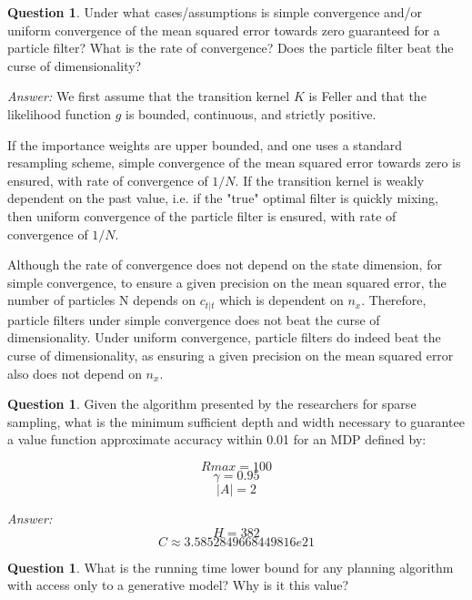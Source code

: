 \documentclass{article}
\theoremstyle{definition}
\newtheorem{question}[thm]{Question}
\newenvironment{answer}{\noindent\textit{Answer:}}{}
\begin{document}
\begin{question}
    Under what cases/assumptions is simple convergence and/or uniform convergence of the mean squared error towards zero guaranteed for a particle filter?  What is the rate of convergence? Does the particle filter beat the curse of dimensionality?
\end{question}

\begin{answer}
    We first assume that the transition kernel $K$ is Feller and that the likelihood function $g$ is bounded, continuous, and strictly positive.

If the importance weights are upper bounded, and one uses a standard resampling scheme, simple convergence of the mean squared error towards zero is ensured, with rate of convergence of $1/N$. If the transition kernel is weakly dependent on the past value, i.e. if the "true" optimal filter is quickly mixing, then uniform convergence of the particle filter is ensured, with rate of convergence of $1/N$.

Although the rate of convergence does not depend on the state dimension, for simple convergence, to ensure a given precision on the mean squared error, the number of particles N depends on $c_{t|t}$ which is dependent on $n_x$. Therefore, particle filters under simple convergence does not beat the curse of dimensionality. Under uniform convergence, particle filters do indeed beat the curse of dimensionality, as ensuring a given precision on the mean squared error also does not depend on $n_x$.
\end{answer}

\begin{question}
    Given the algorithm presented by the researchers for sparse sampling, what
is the minimum sufficient depth and width necessary to guarantee a value
function approximate accuracy within 0.01 for an MDP defined by:

$$Rmax = 100$$
$$\gamma = 0.95$$
$$|A| = 2$$
\end{question}

\begin{answer}
$$H = 382$$
$$C \approx 3.5852849668449816e21$$
\end{answer}

\begin{question}
    What is the running time lower bound for any planning algorithm with access only to a generative model?  Why is it this value?
\end{question}
\end{document}
